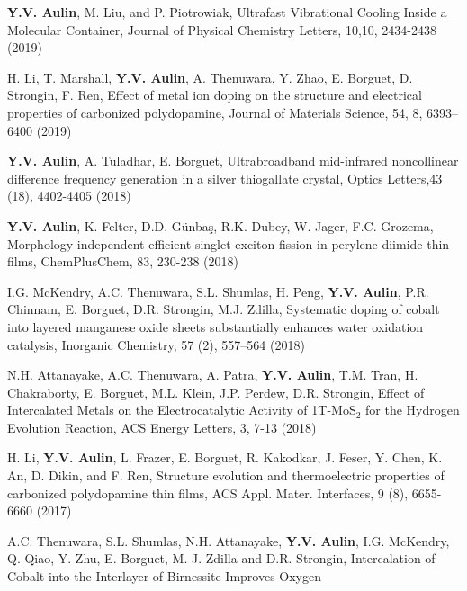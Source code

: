\documentclass[11pt,letterpaper,sans]{moderncv} %
\begin{document}
\begin{etaremune}
	\item \textbf{Y.V. Aulin}, M. Liu, and P. Piotrowiak,
	      Ultrafast Vibrational Cooling Inside a Molecular Container, 
	      Journal of Physical Chemistry Letters, 10,10, 2434-2438 (2019)
	\item H. Li, T. Marshall, \textbf{Y.V. Aulin}, A. Thenuwara, Y. Zhao, E. Borguet, 
	      D. Strongin, F. Ren, Effect of metal ion doping on the structure 
	      and electrical properties of carbonized polydopamine, 
	      Journal of Materials Science, 54, 8, 6393–6400 (2019)
	\item \textbf{Y.V. Aulin}, A. Tuladhar, E. Borguet, 
	      Ultrabroadband mid-infrared noncollinear difference frequency
              generation in a silver thiogallate crystal, 
              Optics Letters,43 (18), 4402-4405 (2018)
        \item \textbf{Y.V. Aulin}, K. Felter, D.D. Günbaş, R.K. Dubey, W. Jager, F.C. Grozema, 
              Morphology independent efficient singlet exciton fission in perylene diimide
              thin films, ChemPlusChem, 83, 230-238 (2018)
        \item I.G. McKendry, A.C. Thenuwara, S.L. Shumlas, H. Peng, \textbf{Y.V. Aulin},
              P.R. Chinnam, E. Borguet, D.R. Strongin, M.J. Zdilla, 
              Systematic doping of cobalt into layered manganese oxide 
              sheets substantially enhances water oxidation catalysis, 
              Inorganic Chemistry, 57 (2), 557–564 (2018) 
        \item N.H. Attanayake, A.C. Thenuwara, A. Patra, \textbf{Y.V. Aulin},
              T.M. Tran, H. Chakraborty, E. Borguet, M.L. Klein, J.P. Perdew, D.R. Strongin,
              Effect of Intercalated Metals on the Electrocatalytic Activity of 1T-MoS$_2$  
              for the Hydrogen Evolution Reaction, ACS Energy Letters, 3, 7-13 (2018) 
        \item H. Li, \textbf{Y.V. Aulin}, L. Frazer, E. Borguet, R. Kakodkar, J. Feser,
              Y. Chen, K. An, D. Dikin, and F. Ren, Structure evolution and thermoelectric
              properties of carbonized polydopamine thin films,
              ACS Appl. Mater. Interfaces, 9 (8), 6655-6660 (2017)
        \item A.C. Thenuwara, S.L. Shumlas, N.H. Attanayake, \textbf{Y.V. Aulin}, 
              I.G. McKendry, Q. Qiao, Y. Zhu, E. Borguet, M. J. Zdilla and D.R. Strongin, 
              Intercalation of Cobalt into the Interlayer of Birnessite Improves Oxygen

\end{etaremune}
\end{document}
